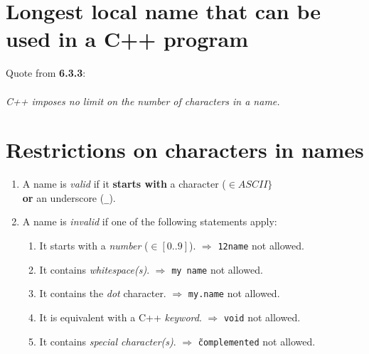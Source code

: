 \documentclass{article}
\begin{document}
 
 \section*{Longest local name that can be used in a C++ program}
 Quote from \textbf{6.3.3}:
 \\
 \\
 \textsl{C++ imposes no limit on the number of characters in a name.}
 
 \section*{Restrictions on characters in names}
 \begin{enumerate}
  \item A name is \textsl{valid} if it \textbf{starts with} a character ($\in ASCII\}$
  \\
  \textbf{or} an underscore (\texttt{\_}).
  \item A name is \textsl{invalid} if one of the following statements apply:
  
  \begin{enumerate}
   \item It starts with a \textsl{number} ($\in[0..9]$). $\Rightarrow$ \texttt{12name} not allowed.
   \item It contains \textsl{whitespace(s)}. $\Rightarrow$ \texttt{my name} not allowed.
   \item It contains the \textsl{dot} character. $\Rightarrow$ \texttt{my.name} not allowed.
   \item It is equivalent with a C++ \textsl{keyword}. $\Rightarrow$ \texttt{void} not allowed.
   \item It contains \textsl{special character(s)}. $\Rightarrow$ \texttt{\~complemented} not allowed.
  \end{enumerate}

 \end{enumerate}

 
\end{document}
